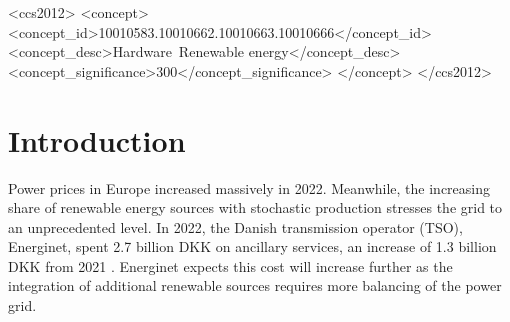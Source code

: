 \documentclass[sigconf]{acmart}
\begin{document}
\begin{CCSXML}
    <ccs2012>
    <concept>
    <concept_id>10010583.10010662.10010663.10010666</concept_id>
    <concept_desc>Hardware~Renewable energy</concept_desc>
    <concept_significance>300</concept_significance>
    </concept>
    </ccs2012>
\end{CCSXML}




\maketitle

\section{Introduction}

Power prices in Europe increased massively in 2022. Meanwhile, the increasing share of renewable energy sources with stochastic production stresses the grid to an unprecedented level. In 2022, the Danish transmission operator (TSO), Energinet, spent 2.7 billion DKK on ancillary services, an increase of 1.3 billion DKK from 2021 \cite{energinetOmkostninger}. Energinet expects this cost will increase further as the integration of additional renewable sources requires more balancing of the power grid.
\end{document}
